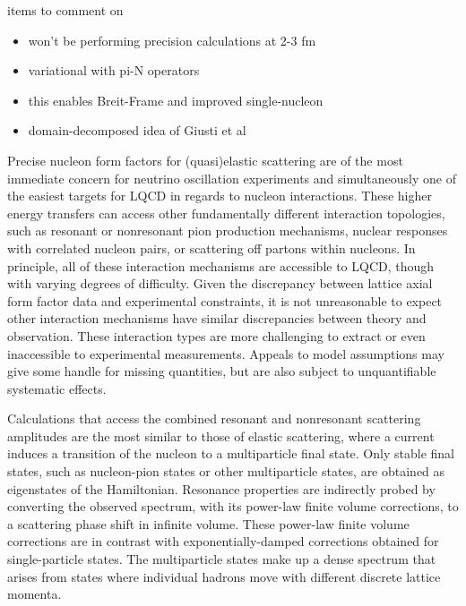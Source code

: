 {\color{red}items to comment on}
\begin{itemize}
\item won't be performing precision calculations at 2-3 fm
\item variational with pi-N operators
\item this enables Breit-Frame and improved single-nucleon
\item domain-decomposed idea of Giusti et al
\end{itemize}


Precise nucleon form factors for (quasi)elastic scattering are of the most immediate concern
 for neutrino oscillation experiments and simultaneously one of the easiest
 targets for LQCD in regards to nucleon interactions.
These higher energy transfers can access other fundamentally different interaction topologies,
 such as resonant or nonresonant pion production mechanisms,
 nuclear responses with correlated nucleon pairs,
 or scattering off partons within nucleons.
In principle, all of these interaction mechanisms are accessible to LQCD,
 though with varying degrees of difficulty.
Given the discrepancy between lattice axial form factor data and experimental constraints,
 it is not unreasonable to expect other interaction mechanisms have similar discrepancies
 between theory and observation.
These interaction types are more challenging to extract or even inaccessible to
 experimental measurements.
Appeals to model assumptions may give some handle for missing quantities,
 but are also subject to unquantifiable systematic effects.

Calculations that access the combined resonant and nonresonant scattering amplitudes
 are the most similar to those of elastic scattering,
 where a current induces a transition of the nucleon to a multiparticle final state.
Only stable final states, such as nucleon-pion states or other multiparticle states,
 are obtained as eigenstates of the Hamiltonian.
Resonance properties are indirectly probed by converting the observed spectrum,
 with its power-law finite volume corrections, to a scattering phase shift in infinite volume.
These power-law finite volume corrections are in contrast with exponentially-damped
 corrections obtained for single-particle states.
The multiparticle states make up a dense spectrum that arises from
 states where individual hadrons move with different discrete lattice momenta.

